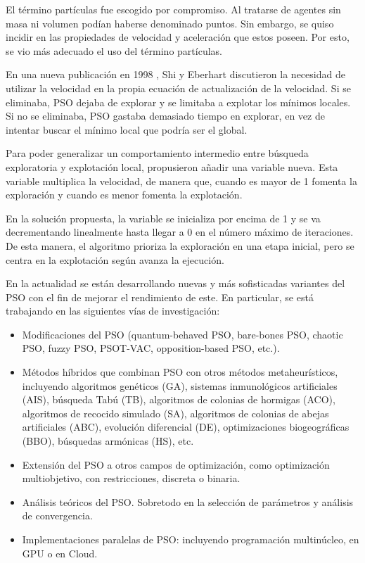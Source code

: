 \documentclass[a4paper,12pt,titlepage]{article}
\begin{document}
El término partículas fue escogido por compromiso. Al tratarse de agentes sin masa ni volumen podían haberse denominado puntos. Sin embargo, se quiso incidir en las propiedades de velocidad y aceleración que estos poseen. Por esto, se vio más adecuado el uso del término partículas. \citep{Kennedy1995}

En una nueva publicación en 1998 \citep{Shi1998}, Shi y Eberhart discutieron la necesidad de utilizar la velocidad en la propia ecuación de actualización de la velocidad. Si se eliminaba, PSO dejaba de explorar y se limitaba a explotar los mínimos locales. Si no se eliminaba, PSO gastaba demasiado tiempo en explorar, en vez de intentar buscar el mínimo local que podría ser el global.

Para poder generalizar un comportamiento intermedio entre búsqueda exploratoria y explotación local, propusieron añadir una variable nueva. Esta variable multiplica la velocidad, de manera que, cuando es mayor de 1 fomenta la exploración y cuando es menor fomenta la explotación.

En la solución propuesta, la variable se inicializa por encima de 1 y se va decrementando linealmente hasta llegar a 0 en el número máximo de iteraciones. De esta manera, el algoritmo prioriza la exploración en una etapa inicial, pero se centra en la explotación según avanza la ejecución.

En la actualidad se están desarrollando nuevas y más sofisticadas variantes del PSO con el fin de mejorar el rendimiento de este. En particular, se está trabajando en las siguientes vías de investigación: \citep{Zhang2015}

\begin{itemize}[noitemsep]
	\item Modificaciones del PSO (quantum-behaved PSO, bare-bones PSO, chaotic PSO, fuzzy PSO, PSOT-VAC, opposition-based PSO, etc.).
	\item Métodos híbridos que combinan PSO con otros métodos metaheurísticos, incluyendo algoritmos genéticos (GA), sistemas inmunológicos artificiales (AIS), búsqueda Tabú (TB), algoritmos de colonias de hormigas (ACO), algoritmos de recocido simulado (SA), algoritmos de colonias de abejas artificiales (ABC), evolución diferencial (DE), optimizaciones biogeográficas (BBO), búsquedas armónicas (HS), etc.
	\item Extensión del PSO a otros campos de optimización, como optimización multiobjetivo, con restricciones, discreta o binaria.
	\item Análisis teóricos del PSO. Sobretodo en la selección de parámetros y análisis de convergencia.
	\item Implementaciones paralelas de PSO: incluyendo programación multinúcleo, en GPU o en Cloud.
\end{itemize}
\end{document}

